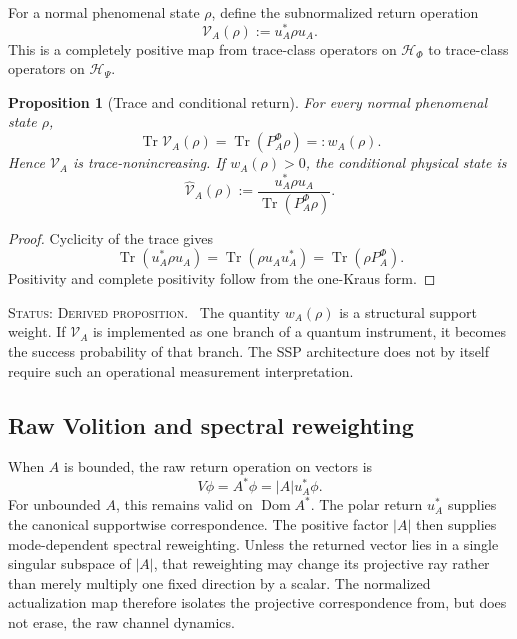 \documentclass[11pt,reqno]{scrartcl}
\newcommand{\scrHP}{\mathscr H_{\Psi}}
\newcommand{\scrHF}{\mathscr H_{\Phi}}
\newcommand{\polA}{u_A}
\newcommand{\absA}{|A|}
\DeclareMathOperator{\Dom}{Dom}
\newcommand{\statuslabel}[1]{\par\smallskip\noindent\textsc{Status: #1.}\ }
\newcommand{\suppProjF}{P_{A}^{\Phi}}
\DeclareMathOperator{\Tr}{Tr}
\newcommand{\presentWeight}{w_{A}}
\newcommand{\returnOp}{\mathcal V_{A}}
\newcommand{\returnOpCond}{\widehat{\mathcal V}_{A}}
\theoremstyle{plain}
\newtheorem{proposition}[proposition]{Proposition}
\theoremstyle{definition}
\theoremstyle{remark}
\begin{document}
For a normal phenomenal state $\rho$, define the subnormalized return
operation
\begin{equation}
  \boxed{
  \returnOp(\rho):=\polA^*\rho\polA.}
  \label{eq:subnormalized-return-operation}
\end{equation}
This is a completely positive map from trace-class operators on $\scrHF$ to
trace-class operators on $\scrHP$.

\begin{proposition}[Trace and conditional return]
\label{prop:return-operation-trace}
For every normal phenomenal state $\rho$,
\begin{equation}
  \Tr\returnOp(\rho)
  =\Tr(\suppProjF\rho)
  =:\presentWeight(\rho).
  \label{eq:mixed-actualization-weight}
\end{equation}
Hence $\returnOp$ is trace-nonincreasing.  If $\presentWeight(\rho)>0$, the
conditional physical state is
\begin{equation}
  \boxed{
  \returnOpCond(\rho)
  :=\frac{\polA^*\rho\polA}
  {\Tr(\suppProjF\rho)}.}
  \label{eq:conditional-return-state}
\end{equation}
\end{proposition}

\begin{proof}
Cyclicity of the trace gives
\begin{equation}
  \Tr(\polA^*\rho\polA)
  =\Tr(\rho\polA\polA^*)
  =\Tr(\rho\suppProjF).
\end{equation}
Positivity and complete positivity follow from the one-Kraus form.
\end{proof}

\statuslabel{Derived proposition} The quantity
$\presentWeight(\rho)$ is a structural support weight.  If
$\returnOp$ is implemented as one branch of a quantum instrument, it becomes
the success probability of that branch.  The SSP architecture does not by
itself require such an operational measurement interpretation.

\subsection{Raw Volition and spectral reweighting}

When $A$ is bounded, the raw return operation on vectors is
\begin{equation}
  V\phi=A^*\phi=\absA\polA^*\phi.
  \label{eq:raw-volition-vector-return}
\end{equation}
For unbounded $A$, this remains valid on $\Dom A^*$.  The polar return
$u_A^*$ supplies the canonical supportwise correspondence.  The positive
factor $|A|$ then supplies mode-dependent spectral reweighting.  Unless the
returned vector lies in a single singular subspace of $|A|$, that reweighting
may change its projective ray rather than merely multiply one fixed direction
by a scalar.  The normalized actualization map therefore isolates the
projective correspondence from, but does not erase, the raw channel dynamics.
\end{document}
